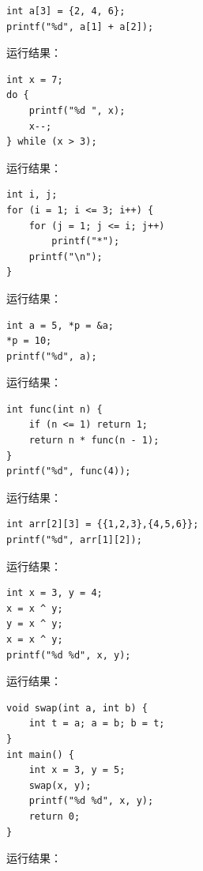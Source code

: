 \documentclass[a4paper,11pt]{article}
\begin{document}
\q
\begin{lstlisting}[language={[custom]C}]
int a[3] = {2, 4, 6};
printf("%d", a[1] + a[2]);
\end{lstlisting}
运行结果：\underline{\hspace{3cm}}


\q
\begin{lstlisting}[language={[custom]C}]
int x = 7;
do {
    printf("%d ", x);
    x--;
} while (x > 3);
\end{lstlisting}
运行结果：\underline{\hspace{3cm}}


\q
\begin{lstlisting}[language={[custom]C}]
int i, j;
for (i = 1; i <= 3; i++) {
    for (j = 1; j <= i; j++)
        printf("*");
    printf("\n");
}
\end{lstlisting}
运行结果：\underline{\hspace{3cm}}


\q
\begin{lstlisting}[language={[custom]C}]
int a = 5, *p = &a;
*p = 10;
printf("%d", a);
\end{lstlisting}
运行结果：\underline{\hspace{3cm}}


\q
\begin{lstlisting}[language={[custom]C}]
int func(int n) {
    if (n <= 1) return 1;
    return n * func(n - 1);
}
printf("%d", func(4));
\end{lstlisting}
运行结果：\underline{\hspace{3cm}}


\q
\begin{lstlisting}[language={[custom]C}]
int arr[2][3] = {{1,2,3},{4,5,6}};
printf("%d", arr[1][2]);
\end{lstlisting}
运行结果：\underline{\hspace{3cm}}


\q
\begin{lstlisting}[language={[custom]C}]
int x = 3, y = 4;
x = x ^ y;
y = x ^ y;
x = x ^ y;
printf("%d %d", x, y);
\end{lstlisting}
运行结果：\underline{\hspace{3cm}}


\q
\begin{lstlisting}[language={[custom]C}]
void swap(int a, int b) {
    int t = a; a = b; b = t;
}
int main() {
    int x = 3, y = 5;
    swap(x, y);
    printf("%d %d", x, y);
    return 0;
}
\end{lstlisting}
运行结果：\underline{\hspace{3cm}}
\end{document}
